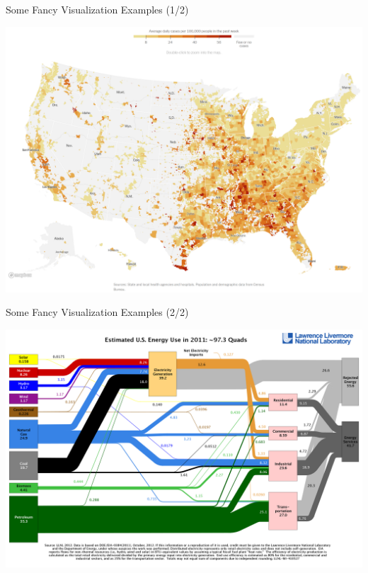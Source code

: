 \documentclass{beamer}
\begin{document}
\begin{frame}{Some Fancy Visualization Examples (1/2)}

\begin{center}
\includegraphics[scale=0.25]{images/covidVisualization1.png}

\end{center}

\end{frame}



\begin{frame}{Some Fancy Visualization Examples (2/2)}

\begin{center}
\includegraphics[scale=0.1]{images/ch2visualization2.png}

\end{center}

\end{frame}
\end{document}
